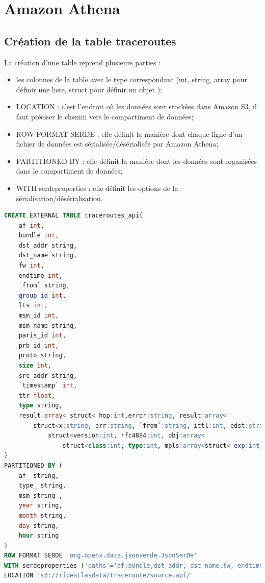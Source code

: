 \appendix

\chapter{Amazon Athena } \label{athena-appendix}

\section{Création de la table traceroutes } \label{creer-table-traceroute}
La création d'une table reprend plusieurs parties :
\begin{itemize}
	\item les colonnes de la table avec le type correspondant (int, string, array pour définir une liste, struct pour définir un objet );
	\item LOCATION : c'est l'endroit où les données sont stockées dans Amazon S3, il faut préciser le chemin vers le compartiment de données;
	\item ROW FORMAT SERDE : elle définit la manière dont chaque ligne d'un fichier de données est sérialisée/désérialisée par Amazon Athena;
	\item PARTITIONED BY : elle définit la manière dont les données sont organisées dans le compartiment de données; 
	\item WITH serdeproperties : elle définit les options de la sérialisation/désérialisation.
\end{itemize}
\begin{lstlisting}[language=SQL, basicstyle=\footnotesize, label=createAthenaTable]
CREATE EXTERNAL TABLE traceroutes_api(
	af int,
	bundle int,
	dst_addr string,
	dst_name string,
	fw int,
	endtime int,
	`from` string,
	group_id int,
	lts int,
	msm_id int,
	msm_name string,
	paris_id int,
	prb_id int,
	proto string,
	size int,
	src_addr string,
	`timestamp` int,
	ttr float,
	type string,
    result array< struct< hop:int,error:string, result:array<
        struct<x:string, err:string, `from`:string, ittl:int, edst:string, late:int, mtu:int, rtt:float, size:int, ttl:int , flags:string, dstoptsize:int, hbhoptsize:int, icmpext:
        	struct<version:int, rfc4884:int, obj:array< 
        		struct<class:int, type:int, mpls:array<struct< exp:int, label:int, s:int, ttl:int>>>>>>>>> 
)
PARTITIONED BY (
	af_ string,
	type_ string,
	msm string ,
	year string,
	month string,
	day string,
	hour string
) 
ROW FORMAT SERDE 'org.openx.data.jsonserde.JsonSerDe'
WITH serdeproperties ('paths'='af,bundle,dst_addr, dst_name,fw, endtime, from, lts, msm_id, paris_id, prb_id, proto, size, src_addr, timestamp, type,fw, msm_name' ) 
LOCATION 's3://ripeatlasdata/traceroute/source=api/'
\end{lstlisting}

